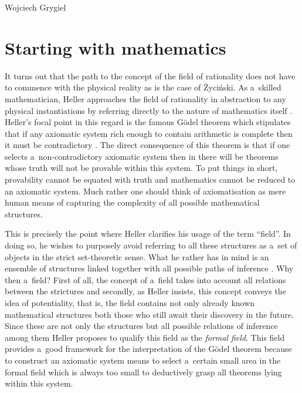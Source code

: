 \begin{artengenv}{Wojciech Grygiel}
\section{Starting with mathematics}
It turns out that the path to the concept of the field of rationality does not have to commence with the physical reality as is the case of Życiński. As a~skilled mathematician, Heller approaches the field of rationality in abstraction to any physical instantiations by referring directly to the nature of mathematics itself
\parencite[][pp.216–238]{heller_uchwycic_1997}. %
 Heller's focal point in this regard is the famous Gödel theorem which stipulates that if any axiomatic system rich enough to contain arithmetic is complete then it must be contradictory 
\parencite[e.g.][pp.66–116]{penrose_shadows_1994}. %
 The direct consequence of this theorem is that if one selects a~non-contradictory axiomatic system then in there will be theorems whose truth will not be provable within this system. To put things in short, provability cannot be equated with truth and mathematics cannot be reduced to an axiomatic system. Much rather one should think of axiomatisation as mere human means of capturing the complexity of all possible mathematical structures.

This is precisely the point where Heller clarifies his usage of the term ``field''. In doing so, he wishes to purposely avoid referring to all these structures as a~set of objects in the strict set-theoretic sense. What he rather has in mind is an ensemble of structures linked together with all possible paths of inference
\parencite[][pp.236–238]{heller_uchwycic_1997}. %
 Why then a~field? First of all, the concept of a~field takes into account all relations between the strictures and secondly, as Heller insists, this concept conveys the idea of potentiality, that is, the field contains not only already known mathematical structures both those who still await their discovery in the future. Since these are not only the structures but all possible relations of inference among them Heller proposes to qualify this field as the \textit{formal field}. This field provides a~good framework for the interpretation of the Gödel theorem because to construct an axiomatic system means to select a~certain small area in the formal field which is always too small to deductively grasp all theorems lying within this system.


\end{artengenv}
